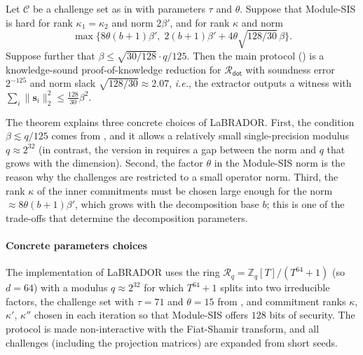 \documentclass[../../book.tex]{subfiles}
\begin{document}
\begin{theorem}\label{thm:labrador-security}
    Let $\mathcal{C}$ be a challenge set as in  with parameters $\tau$ and $\theta$.
    Suppose that Module-SIS is hard for rank $\kappa_1 = \kappa_2$ and norm $2\beta'$, and for rank $\kappa$ and norm
    \begin{equation*}
        \max\Big\{8\theta(b+1)\beta', \; 2(b+1)\beta' + 4\theta\sqrt{128/30}\,\beta\Big\}.
    \end{equation*}
    Suppose further that $\beta \leq \sqrt{30/128}\cdot q/125$.
    Then the main protocol () is a knowledge-sound proof-of-knowledge reduction for $\mathcal{R}_{\mathsf{dot}}$ with soundness error $2^{-125}$ and norm slack $\sqrt{128/30} \approx 2.07$, \textit{i.e.}, the extractor outputs a witness with $\sum_i \|\mathbf{s}_i\|_2^2 \leq \frac{128}{30}\beta^2$.
\end{theorem}

The theorem explains three concrete choices of LaBRADOR.
First, the condition $\beta \lesssim q/125$ comes from , and it allows a relatively small single-precision modulus $q \approx 2^{32}$ (in contrast, the version in  requires a gap between the norm and $q$ that grows with the dimension).
Second, the factor $\theta$ in the Module-SIS norm is the reason why the challenges are restricted to a small operator norm.
Third, the rank $\kappa$ of the inner commitments must be chosen large enough for the norm $\approx 8\theta(b+1)\beta'$, which grows with the decomposition base $b$; this is one of the trade-offs that determine the decomposition parameters.
\fi

\paragraph{Concrete parameters choices}
The implementation of LaBRADOR uses the ring $\mathcal{R}_q = \mathbb{Z}_q[T]/(T^{64}+1)$ (so $d = 64$) with a modulus $q \approx 2^{32}$ for which $T^{64}+1$ splits into two irreducible factors, the challenge set with $\tau = 71$ and $\theta = 15$ from , and commitment ranks $\kappa$, $\kappa'$, $\kappa''$ chosen in each iteration so that Module-SIS offers $128$ bits of security.
The protocol is made non-interactive with the Fiat-Shamir transform, and all challenges (including the projection matrices) are expanded from short seeds.
\end{document}
